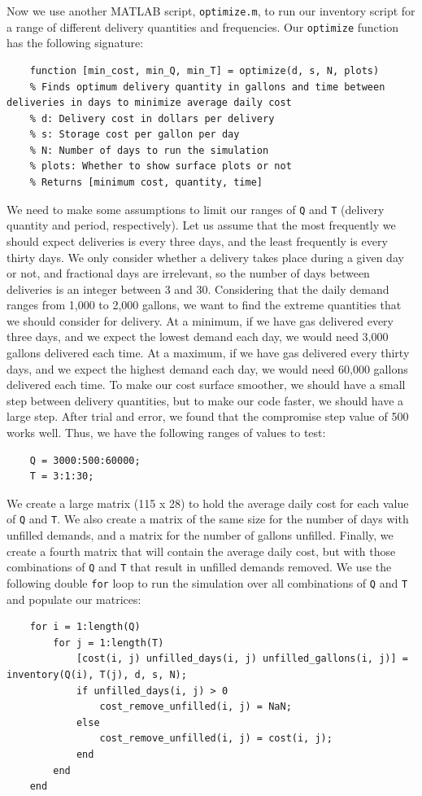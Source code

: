 \documentclass{article}
\begin{document}
    Now we use another MATLAB script, \texttt{optimize.m}, to run our inventory script for a range of different delivery quantities and frequencies. Our \texttt{optimize} function has the following signature:
    \begin{verbatim}
    function [min_cost, min_Q, min_T] = optimize(d, s, N, plots)
    % Finds optimum delivery quantity in gallons and time between deliveries in days to minimize average daily cost
    % d: Delivery cost in dollars per delivery
    % s: Storage cost per gallon per day
    % N: Number of days to run the simulation
    % plots: Whether to show surface plots or not
    % Returns [minimum cost, quantity, time]
    \end{verbatim}
    We need to make some assumptions to limit our ranges of \texttt{Q} and \texttt{T} (delivery quantity and period, respectively). Let us assume that the most frequently we should expect deliveries is every three days, and the least frequently is every thirty days. We only consider whether a delivery takes place during a given day or not, and fractional days are irrelevant, so the number of days between deliveries is an integer between 3 and 30. Considering that the daily demand ranges from 1,000 to 2,000 gallons, we want to find the extreme quantities that we should consider  for delivery. At a minimum, if we have gas delivered every three days, and we expect the lowest demand each day, we would need 3,000 gallons delivered each time. At a maximum, if we have gas delivered every thirty days, and we expect the highest demand each day, we would need 60,000 gallons delivered each time. To make our cost surface smoother, we should have a small step between delivery quantities, but to make our code faster, we should have a large step. After trial and error, we found that the compromise step value of 500 works well. Thus, we have the following ranges of values to test:
    \begin{verbatim}
    Q = 3000:500:60000;
    T = 3:1:30;
    \end{verbatim}

    \pagebreak
    We create a large matrix (115 x 28) to hold the average daily cost for each value of \texttt{Q} and \texttt{T}. We also create a matrix of the same size for the number of days with unfilled demands, and a matrix for the number of gallons unfilled. Finally, we create a fourth matrix that will contain the average daily cost, but with those combinations of \texttt{Q} and \texttt{T} that result in unfilled demands removed. We use the following double \texttt{for} loop to run the simulation over all combinations of \texttt{Q} and \texttt{T} and populate our matrices:
    \begin{verbatim}
    for i = 1:length(Q)
        for j = 1:length(T)
            [cost(i, j) unfilled_days(i, j) unfilled_gallons(i, j)] = inventory(Q(i), T(j), d, s, N);
            if unfilled_days(i, j) > 0
                cost_remove_unfilled(i, j) = NaN;
            else
                cost_remove_unfilled(i, j) = cost(i, j);
            end
        end
    end
    \end{verbatim}
\end{document}

